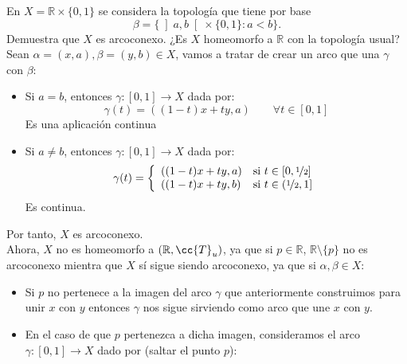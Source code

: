 \begin{ejercicio}
    En $X=\mathbb{R}\times \{0,1\}$ se considera la topología que tiene por base
    \begin{equation*}
        \beta = \{\left]a,b\right[\times \{0,1\} : a<b\}.
    \end{equation*}
    Demuestra que $X$ es arcoconexo. ¿Es $X$ homeomorfo a $\mathbb{R}$ con la topología usual?\\

    \noindent
    Sean $\alpha=(x,a),\beta=(y,b)\in X$, vamos a tratar de crear un arco que una $\gamma$ con $\beta$:
    \begin{itemize}
        \item Si $a=b$, entonces $\gamma:[0,1]\to X$ dada por:
            \begin{equation*}
                \gamma(t) = ((1-t)x + ty, a) \qquad \forall t\in [0,1]
            \end{equation*}
            Es una aplicación continua%
        \item Si $a\neq b$, entonces $\gamma:[0,1]\to X$ dada por:
            \begin{equation*}
                \gamma(t) = \left\{\begin{array}{ll}
                        ((1-t)x + ty, a) & \text{si\ } t \in [0,\nicefrac{1}{2}] \\
                        ((1-t)x + ty, b) & \text{si\ } t\in (\nicefrac{1}{2},1]
                \end{array}\right.
            \end{equation*}
            Es continua.%
    \end{itemize}
    Por tanto, $X$ es arcoconexo.\\

    \noindent
    Ahora, $X$ no es homeomorfo a $(\mathbb{R},\cc{T}_u)$, ya que si $p\in \mathbb{R}$, $\mathbb{R}\setminus \{p\}$ no es arcoconexo mientra que $X$ sí sigue siendo arcoconexo, ya que si $\alpha,\beta\in X$:
    \begin{itemize}
        \item Si $p$ no pertenece a la imagen del arco $\gamma$ que anteriormente construimos para unir $x$ con $y$ entonces $\gamma$ nos sigue sirviendo como arco que une $x$ con $y$.
        \item En el caso de que $p$ pertenezca a dicha imagen, consideramos el arco $\gamma:[0,1]\to X$ dado por (saltar el punto $p$): %
    \end{itemize}
\end{ejercicio}

